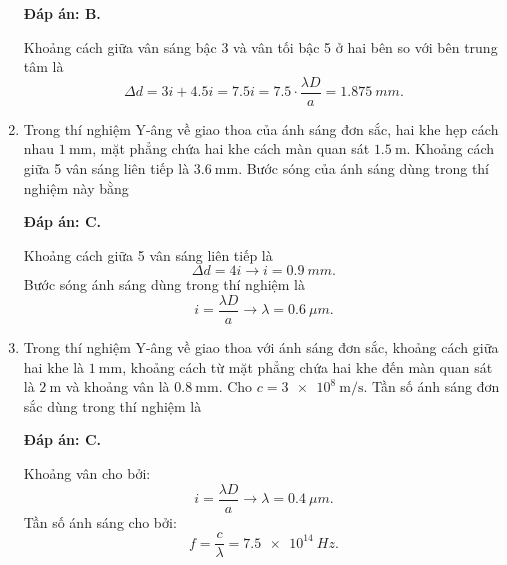 \begin{enumerate}[label=\bfseries Câu \arabic*:]
	\loigiai
	{		\textbf{Đáp án: B.}
		
Khoảng cách giữa vân sáng bậc 3 và vân tối bậc 5 ở hai bên so với bên trung tâm là
$$
	\Delta d = 3i + \num{4,5}i = \num{7,5}i = \num{7,5} \cdot \dfrac{\lambda D}{a} = \SI{1,875}{mm}.
$$
		
	}
	
\item {} 
	
	\cauhoi
	{Trong thí nghiệm Y-âng về giao thoa của ánh sáng đơn sắc, hai khe hẹp cách nhau $\SI{1}{\milli \meter}$, mặt phẳng chứa hai khe cách màn quan sát $\SI{1.5}{\meter}$. Khoảng cách giữa 5 vân sáng liên tiếp là $\SI{3.6}{\milli \meter}$. Bước sóng của ánh sáng dùng trong thí nghiệm này bằng
	}
	
	\loigiai
	{		\textbf{Đáp án: C.}
	
Khoảng cách giữa 5 vân sáng liên tiếp là
$$
	\Delta d = 4i \rightarrow i = \SI{0,9}{mm}.
$$
Bước sóng ánh sáng dùng trong thí nghiệm là
$$
	i = \dfrac{\lambda D}{a} \rightarrow \lambda = \SI{0,6}{\mu m}.
$$
		
	}
	
	\item {} 
	
	\cauhoi
	{Trong thí nghiệm Y-âng về giao thoa với ánh sáng đơn sắc, khoảng cách giữa hai khe là $\SI{1}{\milli \meter}$, khoảng cách từ mặt phẳng chứa hai khe đến màn quan sát là $\SI{2}{\meter}$ và khoảng vân là $\SI{0.8}{\milli \meter}$. Cho $c=\SI{3e8}{\meter / \second}$. Tần số ánh sáng đơn sắc dùng trong thí nghiệm là
	}
	
	\loigiai
	{		\textbf{Đáp án: C.}
		
Khoảng vân cho bởi:
$$
	i = \dfrac{\lambda D}{a} \rightarrow \lambda = \SI{0,4}{\mu m}.
$$
Tần số ánh sáng cho bởi:
$$
	f = \dfrac{c}{\lambda} = \SI{7,5 e14}{Hz}.
$$
		
}
\end{enumerate}
